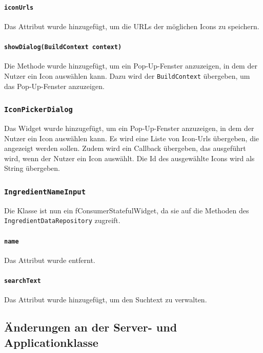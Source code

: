\documentclass{implementierungsheft}
\begin{document}
\paragraph{\texttt{iconUrls}} Das Attribut wurde hinzugefügt, um die URLs der möglichen Icons zu speichern.
\paragraph{\texttt{showDialog(BuildContext context)}} Die Methode wurde hinzugefügt, um ein Pop-Up-Fenster anzuzeigen, in dem der Nutzer ein Icon auswählen kann. Dazu wird der \texttt{BuildContext} übergeben, um das Pop-Up-Fenster anzuzeigen.
\subsubsection*{\texttt{IconPickerDialog}}
Das Widget wurde hinzugefügt, um ein Pop-Up-Fenster anzuzeigen, in dem der Nutzer ein Icon auswählen kann. Es wird eine Liste von Icon-Urls übergeben, die angezeigt werden sollen. Zudem wird ein Callback übergeben, das ausgeführt wird, wenn der Nutzer ein Icon auswählt. Die Id des ausgewählte Icons wird als String übergeben.
\subsubsection*{\texttt{IngredientNameInput}}
Die Klasse ist nun ein fConsumerStatefulWidget, da sie auf die Methoden des \texttt{IngredientDataRe\-pository} zugreift.
\paragraph{\texttt{name}} Das Attribut wurde entfernt.
\paragraph{\texttt{searchText}} Das Attribut wurde hinzugefügt, um den Suchtext zu verwalten.

\subsection{Änderungen an der Server- und Applicationklasse}
\end{document}
